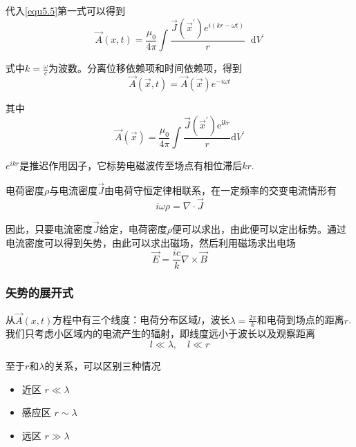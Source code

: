 \documentclass[UTF8]{ctexart}
\begin{document}
    代入\autoref{equ5.5}第一式可以得到
    \begin{equation}
        \vec{A} (x,t) = \frac{\mu_0}{4 \pi} \int \frac{\vec{J}(\vec{x}^{\prime})e^{i(kr-\omega t)}}{r} \mathop{}\!\mathrm{d} V^{\prime}
    \end{equation}

\noindent 式中$k = \frac{\omega}{c}$为波数。分离位移依赖项和时间依赖项，得到
\begin{equation}
    \vec{A}(\vec{x},t) = \vec{A}(\vec{x}) e^{-i \omega t} 
\end{equation}

\noindent 其中
\begin{equation}
    \vec{A}(\vec{x})=\frac{\mu_{0}}{4 \pi} \int \frac{\vec{J}\left(\vec{x}^{\prime}\right) \mathrm{e}^{\mathrm{i} k r}}{r} \mathrm{d} V^{\prime}\label{equ5.16}
\end{equation}

\noindent $e^{i k r}$是推迟作用因子，它标势电磁波传至场点有相位滞后$kr$.

    电荷密度$\rho$与电流密度$\vec{J}$由电荷守恒定律相联系，在一定频率的交变电流情形有
    \begin{equation}
        i \omega \rho = \nabla \cdot \vec{J}
    \end{equation}

\noindent 因此，只要电流密度$\vec{J}$给定，电荷密度$\rho$便可以求出，由此便可以定出标势。通过电流密度可以得到矢势，由此可以求出磁场，然后利用磁场求出电场
\begin{equation}
    \vec{E} = \frac{ic}{k} \nabla \times \vec{B}
\end{equation}

    \subsubsection{矢势的展开式}
    从$\vec{A}(x,t)$方程中有三个线度：电荷分布区域$l$，波长$\lambda = \frac{2 \pi}{k}$和电荷到场点的距离$r$. 我们只考虑小区域内的电流产生的辐射，即线度远小于波长以及观察距离
    \begin{equation}
        l \ll \lambda, \quad l \ll r \label{equ5.6}
    \end{equation}

\noindent 至于$r$和$\lambda$的关系，可以区别三种情况
\begin{itemize}
    \item 近区 \quad $r \ll \lambda$
    \item 感应区 \quad $r \sim \lambda$
    \item 远区 \quad $r \gg \lambda$
\end{itemize}
\end{document}
